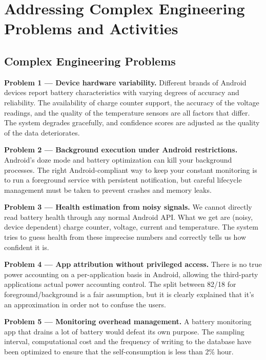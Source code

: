 \documentclass[12pt,a4paper]{report}
\begin{document}
\chapter{Addressing Complex Engineering Problems and Activities}

\section{Complex Engineering Problems}

\textbf{Problem 1 — Device hardware variability.}
Different brands of Android devices report battery characteristics with varying degrees of accuracy and reliability. The availability of charge counter support, the accuracy of the voltage readings, and the quality of the temperature sensors are all factors that differ. The system degrades gracefully, and confidence scores are adjusted as the quality of the data deteriorates.

\textbf{Problem 2 — Background execution under Android restrictions.}
Android's doze mode and battery optimization can kill your background processes. The right Android-compliant way to keep your constant monitoring is to run a foreground service with persistent notification, but careful lifecycle management must be taken to prevent crashes and memory leaks.

\textbf{Problem 3 — Health estimation from noisy signals.}
We cannot directly read battery health through any normal Android API. What we get are (noisy, device dependent) charge counter, voltage, current and temperature. The system tries to guess health from these imprecise numbers and correctly tells us how confident it is.

\textbf{Problem 4 — App attribution without privileged access.}
There is no true power accounting on a per-application basis in Android, allowing the third-party applications actual power accounting control. The split between 82/18 for foreground/background is a fair assumption, but it is clearly explained that it's an approximation in order not to confuse the users.

\textbf{Problem 5 — Monitoring overhead management.}
A battery monitoring app that drains a lot of battery would defeat its own purpose. The sampling interval, computational cost and the frequency of writing to the database have been optimized to ensure that the self-consumption is less than 2\% hour.
\end{document}
